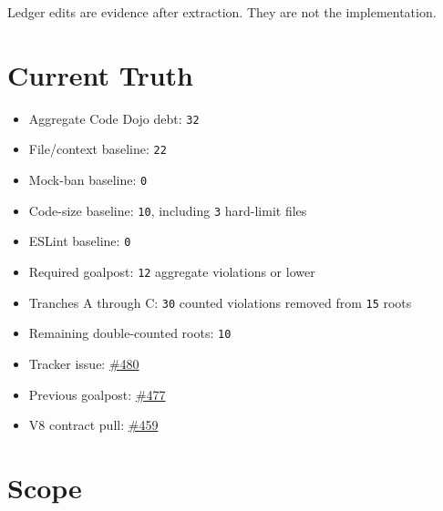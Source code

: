 Ledger edits are evidence after extraction. They are not the implementation.

\section{Current Truth}\label{record-247-current-truth}

\begin{itemize}
\tightlist
\item
  Aggregate Code Dojo debt: \texttt{3\allowbreak{}2}
\item
  File/context baseline: \texttt{2\allowbreak{}2}
\item
  Mock-ban baseline: \texttt{0}
\item
  Code-size baseline: \texttt{1\allowbreak{}0}, including \texttt{3} hard-limit files
\item
  ESLint baseline: \texttt{0}
\item
  Required goalpost: \texttt{1\allowbreak{}2} aggregate violations or lower
\item
  Tranches A through C: \texttt{3\allowbreak{}0} counted violations removed from \texttt{1\allowbreak{}5} roots
\item
  Remaining double-counted roots: \texttt{1\allowbreak{}0}
\item
  Tracker issue: \href{https://github.com/flyingrobots/bijou/issues/480}{\#480}
\item
  Previous goalpost: \href{https://github.com/flyingrobots/bijou/issues/477}{\#477}
\item
  V8 contract pull: \href{https://github.com/flyingrobots/bijou/issues/459}{\#459}
\end{itemize}

\section{Scope}\label{record-247-scope}

